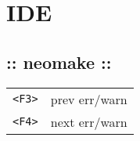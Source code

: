 \section{\hrulefill IDE\hrulefill}
\subsection{:: neomake ::}
\begin{tabular}{@{}ll@{}}
    \verb!<F3>!     & prev err/warn \\
    \verb!<F4>!     & next err/warn \\
\end{tabular}
